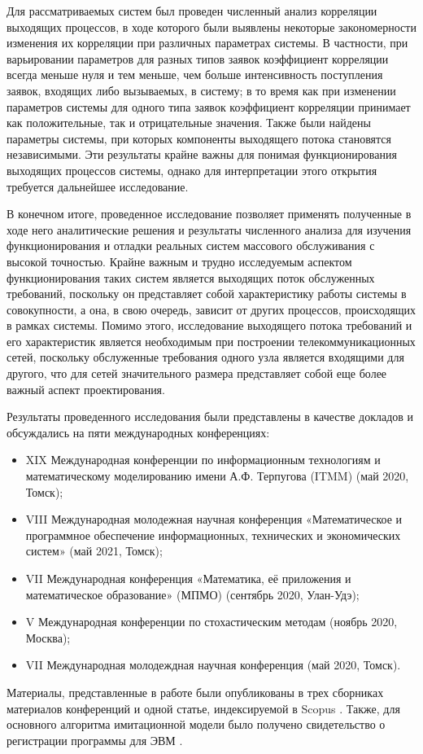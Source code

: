 Для рассматриваемых систем был проведен численный анализ корреляции выходящих процессов, в ходе которого были выявлены некоторые закономерности изменения их корреляции при различных параметрах системы. В частности, при варьировании параметров для разных типов заявок коэффициент корреляции всегда меньше нуля и тем меньше, чем больше интенсивность поступления заявок, входящих либо вызываемых, в систему; в то время как при изменении параметров системы для одного типа заявок коэффициент корреляции принимает как положительные, так и отрицательные значения. Также были найдены параметры системы, при которых компоненты выходящего потока становятся независимыми. Эти результаты крайне важны для понимая функционирования выходящих процессов системы, однако для интерпретации этого открытия требуется дальнейшее исследование.

В конечном итоге, проведенное исследование позволяет применять полученные в ходе него аналитические решения и результаты численного анализа  для изучения функционирования и отладки реальных систем массового обслуживания \cite{deering1991icmp,nutt1982performance} с высокой точностью. Крайне важным и трудно исследуемым аспектом функционирования таких систем является выходящих поток обслуженных требований, поскольку он представляет собой характеристику работы системы в совокупности, а она, в свою очередь, зависит от других процессов, происходящих в рамках системы. Помимо этого, исследование выходящего потока требований и его характеристик является необходимым при построении телекоммуникационных сетей, поскольку обслуженные требования одного узла является входящими для другого, что для сетей значительного размера представляет собой еще более важный аспект проектирования.

Результаты проведенного исследования были представлены в качестве докладов и обсуждались на пяти международных конференциях:
\begin{itemize}
\item XIX Международная конференции по информационным технологиям и математическому моделированию имени А.Ф. Терпугова (ITMM) (май 2020, Томск);
\item VIII Международная молодежная научная конференция «Математическое и программное обеспечение информационных, технических и экономических систем» (май 2021, Томск);
\item VII Международная конференция «Математика, её приложения и математическое образование» (МПМО) (сентябрь 2020, Улан-Удэ);
\item V Международная конференции по стохастическим методам (ноябрь 2020, Москва);
\item VII Международная молодеждная научная конференция  (май 2020, Томск).
\end{itemize}
Материалы, представленные в работе были опубликованы в трех сборниках материалов конференций \cite{itmm_2021,icsm,mpmo} и одной статье, индексируемой в Scopus \cite{blaginin2020two}. Также, для основного алгоритма имитационной модели было получено свидетельство о регистрации программы для ЭВМ \cite{evm}.
 \clearpage